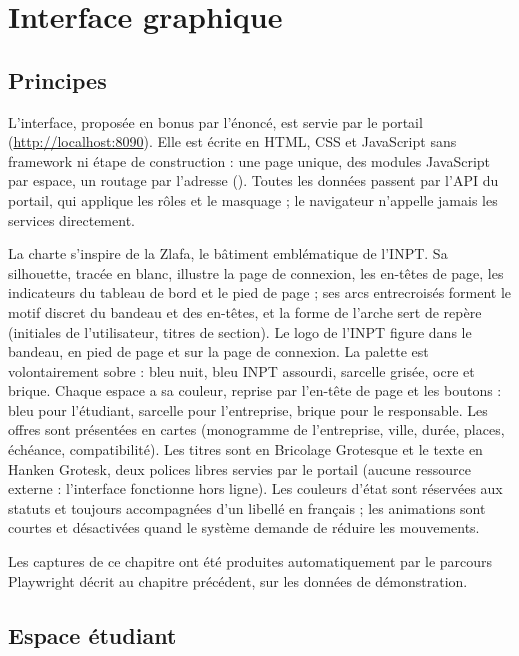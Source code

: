 \chapter{Interface graphique}\label{chap:interface}

\section{Principes}

L'interface, proposée en bonus par l'énoncé, est servie par le portail (\url{http://localhost:8090}). Elle est écrite en HTML, CSS et JavaScript sans framework ni étape de construction : une page unique, des modules JavaScript par espace, un routage par l'adresse (). Toutes les données passent par l'API du portail, qui applique les rôles et le masquage ; le navigateur n'appelle jamais les services directement.

La charte s'inspire de la Zlafa, le bâtiment emblématique de l'INPT. Sa silhouette, tracée en blanc, illustre la page de connexion, les en-têtes de page, les indicateurs du tableau de bord et le pied de page ; ses arcs entrecroisés forment le motif discret du bandeau et des en-têtes, et la forme de l'arche sert de repère (initiales de l'utilisateur, titres de section). Le logo de l'INPT figure dans le bandeau, en pied de page et sur la page de connexion. La palette est volontairement sobre : bleu nuit, bleu INPT assourdi, sarcelle grisée, ocre et brique. Chaque espace a sa couleur, reprise par l'en-tête de page et les boutons : bleu pour l'étudiant, sarcelle pour l'entreprise, brique pour le responsable. Les offres sont présentées en cartes (monogramme de l'entreprise, ville, durée, places, échéance, compatibilité). Les titres sont en Bricolage Grotesque et le texte en Hanken Grotesk, deux polices libres servies par le portail (aucune ressource externe : l'interface fonctionne hors ligne). Les couleurs d'état sont réservées aux statuts et toujours accompagnées d'un libellé en français ; les animations sont courtes et désactivées quand le système demande de réduire les mouvements.

Les captures de ce chapitre ont été produites automatiquement par le parcours Playwright décrit au chapitre précédent, sur les données de démonstration.


\section{Espace étudiant}

